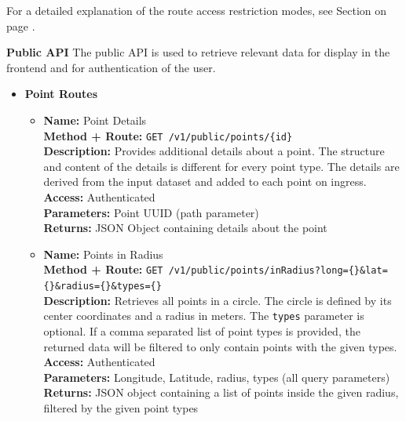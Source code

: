 For a detailed explanation of the route access restriction modes, see Section
\textbf{} on page \pageref{middleware_route_authorisation}.

\textbf{Public API}
The public API is used to retrieve relevant data for display in the frontend and
for authentication of the user.

\begin{itemize}
  \item{
    \textbf{Point Routes}
    \begin{itemize}
      \item { \textbf{Name:} Point Details\\
          \textbf{Method + Route:} \texttt{GET /v1/public/points/\{id\}}\\
          \textbf{Description:} Provides additional details about a point. The
          structure and content of the details is different for every point
          type. The details are derived from the input dataset and added to each
          point on ingress.\\
          \textbf{Access:} Authenticated\\
          \textbf{Parameters:} Point UUID (path parameter)\\
          \textbf{Returns:} JSON Object containing details about the point\\
        }
      \item { \textbf{Name:} Points in Radius\\
          \textbf{Method + Route:} \texttt{GET
          /v1/public/points/inRadius?long=\{\}\&lat=\{\}\&radius=\{\}\&types=\{\}}\\
          \textbf{Description:} Retrieves all points in a circle. The circle is
          defined by its center coordinates and a radius in meters. The
          \texttt{types} parameter is optional. If a comma separated list of
          point types is provided, the returned data will be filtered to only
          contain points with the given types.\\
          \textbf{Access:} Authenticated\\
          \textbf{Parameters:} Longitude, Latitude, radius, types (all query
          parameters)\\
          \textbf{Returns:} JSON object containing a list of points inside the
          given radius, filtered by the given point types\\
        }
    \end{itemize}
}
\end{itemize}
